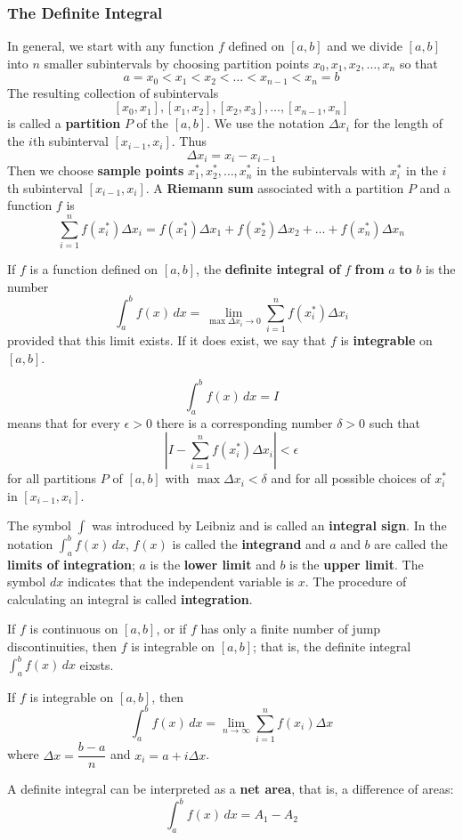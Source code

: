 \subsubsection*{The Definite Integral}
In general, we start with any function \(f\) defined on \([a,b]\) and we
divide \([a,b]\) into \(n\) smaller subintervals by choosing partition points
\(x_0,x_1,x_2,\dots,x_n\) so that
\[a=x_0<x_1<x_2<\dots<x_{n-1}<x_n=b\]
The resulting collection of subintervals
\[[x_0,x_1],[x_1,x_2],[x_2,x_3],\dots,[x_{n-1},x_n]\]
is called a \textbf{partition} \(P\) of the \([a,b]\).
We use the notation \(\Delta x_i\) for the length of the \(i\)th subinterval
\([x_{i-1},x_i]\).
Thus
\[\Delta x_i=x_i-x_{i-1}\]
Then we choose \textbf{sample points} \(x_1^*,x_2^*,\dots,x_n^*\) in the
subintervals with \(x_i^*\) in the \(i\)th subinterval \([x_{i-1},x_i]\).
A \textbf{Riemann sum} associated with a partition \(P\) and a function \(f\)
is
\[\sum_{i=1}^n f(x_i^*)\Delta x_i=f(x_1^*)\Delta x_1+f(x_2^*)\Delta x_2
+\dots+f(x_n^*)\Delta x_n\]
\begin{definition}
    If \(f\) is a function defined on \([a,b]\),
    the \textbf{definite integral of} \(f\) \textbf{from} \(a\) \textbf{to}
    \(b\) is the number
    \[\int_a^b f(x)\,dx=\lim_{\max\Delta x_i\to 0}
    \sum_{i=1}^n f(x_i^*)\Delta x_i\]
    provided that this limit exists.
    If it does exist, we say that \(f\) is \textbf{integrable} on \([a,b]\).
\end{definition}
\begin{definition}
    \[\int_a^b f(x)\,dx=I\]
    means that for every \(\epsilon>0\) there is a corresponding number
    \(\delta>0\) such that
    \[\left\lvert I-\sum_{i=1}^n f(x_i^*)\Delta x_i\right\rvert<\epsilon\]
    for all partitions \(P\) of \([a,b]\) with \(\max\Delta x_i<\delta\) and
    for all possible choices of \(x_i^*\) in \([x_{i-1},x_i]\).
\end{definition}
The symbol \(\displaystyle{\int}\) was introduced by Leibniz and is called an
\textbf{integral sign}.
In the notation \(\displaystyle{\int_a^b f(x)\,dx}\), \(f(x)\) is called the
\textbf{integrand} and \(a\) and \(b\) are called the
\textbf{limits of integration}; \(a\) is the \textbf{lower limit} and \(b\) is the
\textbf{upper limit}.
The symbol \(dx\) indicates that the independent variable is \(x\).
The procedure of calculating an integral is called \textbf{integration}.
\begin{theorem}
    If \(f\) is continuous on \([a,b]\), or if \(f\) has only a finite number
    of jump discontinuities, then \(f\) is integrable on \([a,b]\); that is,
    the definite integral \(\displaystyle{\int_a^b f(x)\,dx}\) eixsts.
\end{theorem}
\begin{theorem}
    If \(f\) is integrable on \([a,b]\), then
    \[\int_a^b f(x)\,dx=\lim_{n\to\infty}\sum_{i=1}^nf(x_i)\Delta x\]
    where \(\Delta x=\dfrac{b-a}{n}\) and \(x_i=a+i\Delta x\).
\end{theorem}
A definite integral can be interpreted as a \textbf{net area}, that is, a
difference of areas:
\[\int_a^b f(x)\,dx=A_1-A_2\]


